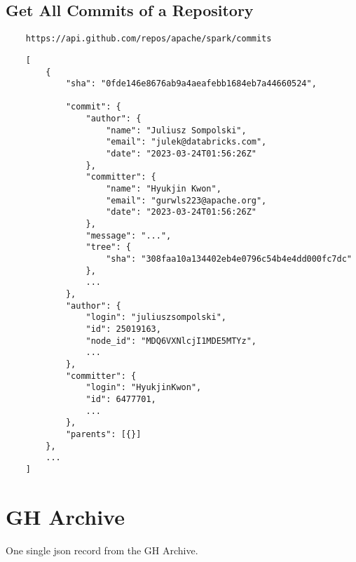\subsection{Get All Commits of a Repository}

\begin{verbatim}
    https://api.github.com/repos/apache/spark/commits
\end{verbatim}


\begin{verbatim}
    [
        {
            "sha": "0fde146e8676ab9a4aeafebb1684eb7a44660524",

            "commit": {
                "author": {
                    "name": "Juliusz Sompolski",
                    "email": "julek@databricks.com",
                    "date": "2023-03-24T01:56:26Z"
                },
                "committer": {
                    "name": "Hyukjin Kwon",
                    "email": "gurwls223@apache.org",
                    "date": "2023-03-24T01:56:26Z"
                },
                "message": "...",
                "tree": {
                    "sha": "308faa10a134402eb4e0796c54b4e4dd000fc7dc"
                },
                ...
            },
            "author": {
                "login": "juliuszsompolski",
                "id": 25019163,
                "node_id": "MDQ6VXNlcjI1MDE5MTYz",
                ...
            },
            "committer": {
                "login": "HyukjinKwon",
                "id": 6477701,
                ...
            },
            "parents": [{}]
        },
        ...
    ]
\end{verbatim}




\section{GH Archive}
\label{a-gha}

One single json record from the GH Archive.

